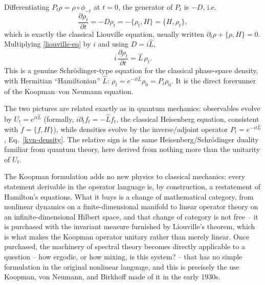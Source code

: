 Differentiating $P_t\rho = \rho\circ\phi_{-t}$ at $t=0$, the generator of $P_t$ 
is $-D$, i.e.
\begin{equation}
\frac{\partial \rho_t}{\partial t} = -D\rho_t = -\{\rho_t,H\} = 
    \{H,\rho_t\},
\label{liouville-eq}
\end{equation}
which is exactly the classical Liouville equation, usually written 
$\partial_t\rho+\{\rho,H\}=0$. Multiplying \eqref{liouville-eq} by $i$ and 
using $D=i\hat L$,
\begin{equation}
\boxed{\ i\,\frac{\partial \rho_t}{\partial t} = \hat L\,\rho_t. \ }
\label{kvn-density}
\end{equation}
This is a genuine Schr\"odinger-type equation for the classical phase-space
density, with Hermitian ``Hamiltonian'' $\hat L$: $\rho_t = e^{-i t \hat L}\rho_0 =
P_t\rho_0$. It is the direct forerunner of the Koopman--von Neumann equation. 

\begin{remark}
The two pictures are related exactly as in quantum mechanics: observables
    evolve by $U_t=e^{i t\hat L}$ (formally, $i\partial_tf_t = -\hat L f_t$, the
    classical Heisenberg equation, consistent with $\dot f=\{f,H\}$), while
    densities evolve by the inverse/adjoint operator $P_t=e^{-i t\hat L}$,
    Eq.~\eqref{kvn-density}. The relative sign is the same
    Heisenberg/Schr\"odinger duality familiar from quantum theory, here derived
    from nothing more than the unitarity of $U_t$.
\end{remark}

The Koopman formulation adds no new physics to classical mechanics: every
statement derivable in the operator language is, by construction, a restatement
of Hamilton's equations. What it buys is a change of mathematical category,
from nonlinear dynamics on a finite-dimensional manifold to linear operator
theory on an infinite-dimensional Hilbert space, and that change of category is
not free -- it is purchased with the invariant measure furnished by Liouville's
theorem, which is what makes the Koopman operator unitary rather than merely
linear. Once purchased, the machinery of spectral theory becomes directly
applicable to a question -- how ergodic, or how mixing, is this system? -- that
has no simple formulation in the original nonlinear language, and this is
precisely the use Koopman, von Neumann, and Birkhoff made of it in the early
1930s.
 
